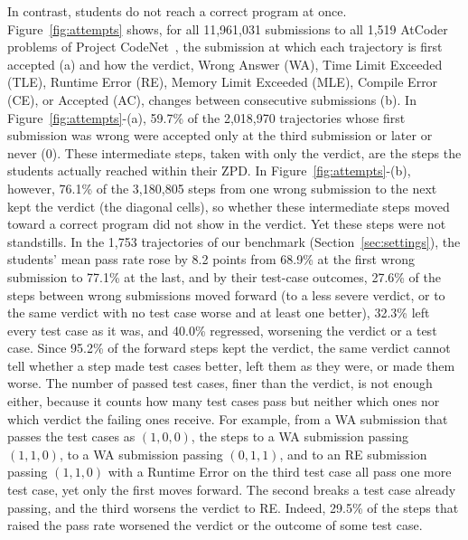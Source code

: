 \documentclass[conference]{IEEEtran}
\begin{document}
In contrast, students do not reach a correct program at once. Figure~\ref{fig:attempts} shows, for all 11,961,031 submissions to all 1,519 AtCoder problems of Project CodeNet~\cite{puri2021codenet}, the submission at which each trajectory is first accepted (a) and how the verdict, Wrong Answer (WA), Time Limit Exceeded (TLE), Runtime Error (RE), Memory Limit Exceeded (MLE), Compile Error (CE), or Accepted (AC), changes between consecutive submissions (b). In Figure~\ref{fig:attempts}-(a), 59.7\% of the 2,018,970 trajectories whose first submission was wrong were accepted only at the third submission or later or never (0). These intermediate steps, taken with only the verdict, are the steps the students actually reached within their ZPD. In Figure~\ref{fig:attempts}-(b), however, 76.1\% of the 3,180,805 steps from one wrong submission to the next kept the verdict (the diagonal cells), so whether these intermediate steps moved toward a correct program did not show in the verdict. Yet these steps were not standstills. In the 1,753 trajectories of our benchmark (Section~\ref{sec:settings}), the students' mean pass rate rose by 8.2 points from 68.9\% at the first wrong submission to 77.1\% at the last, and by their test-case outcomes, 27.6\% of the steps between wrong submissions moved forward (to a less severe verdict, or to the same verdict with no test case worse and at least one better), 32.3\% left every test case as it was, and 40.0\% regressed, worsening the verdict or a test case. Since 95.2\% of the forward steps kept the verdict, the same verdict cannot tell whether a step made test cases better, left them as they were, or made them worse. The number of passed test cases, finer than the verdict, is not enough either, because it counts how many test cases pass but neither which ones nor which verdict the failing ones receive. For example, from a WA submission that passes the test cases as \((1,0,0)\), the steps to a WA submission passing \((1,1,0)\), to a WA submission passing \((0,1,1)\), and to an RE submission passing \((1,1,0)\) with a Runtime Error on the third test case all pass one more test case, yet only the first moves forward. The second breaks a test case already passing, and the third worsens the verdict to RE. Indeed, 29.5\% of the steps that raised the pass rate worsened the verdict or the outcome of some test case.
\end{document}
